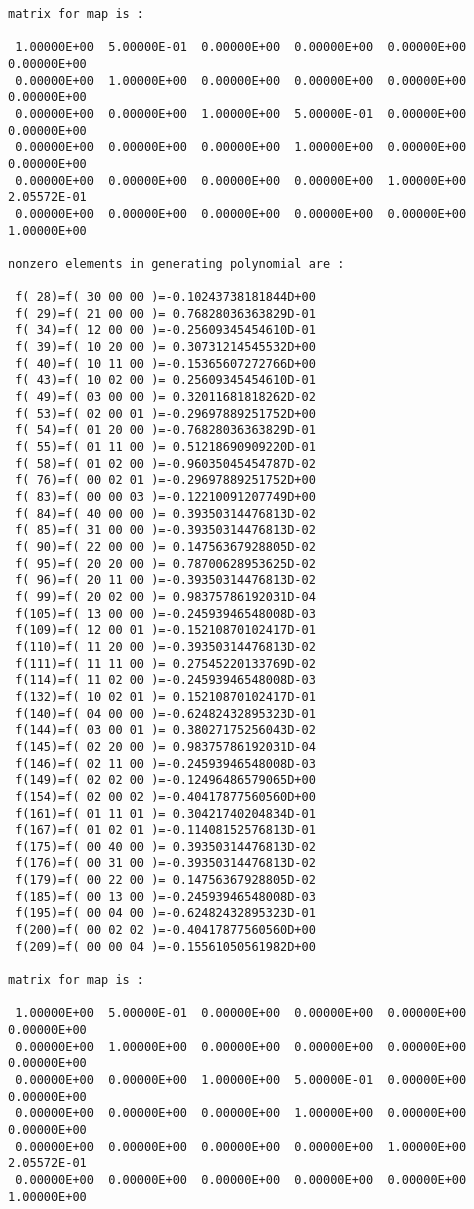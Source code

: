 \begin{footnotesize}
\begin{verbatim}
matrix for map is :

 1.00000E+00  5.00000E-01  0.00000E+00  0.00000E+00  0.00000E+00  0.00000E+00
 0.00000E+00  1.00000E+00  0.00000E+00  0.00000E+00  0.00000E+00  0.00000E+00
 0.00000E+00  0.00000E+00  1.00000E+00  5.00000E-01  0.00000E+00  0.00000E+00
 0.00000E+00  0.00000E+00  0.00000E+00  1.00000E+00  0.00000E+00  0.00000E+00
 0.00000E+00  0.00000E+00  0.00000E+00  0.00000E+00  1.00000E+00  2.05572E-01
 0.00000E+00  0.00000E+00  0.00000E+00  0.00000E+00  0.00000E+00  1.00000E+00

nonzero elements in generating polynomial are :

 f( 28)=f( 30 00 00 )=-0.10243738181844D+00
 f( 29)=f( 21 00 00 )= 0.76828036363829D-01
 f( 34)=f( 12 00 00 )=-0.25609345454610D-01
 f( 39)=f( 10 20 00 )= 0.30731214545532D+00
 f( 40)=f( 10 11 00 )=-0.15365607272766D+00
 f( 43)=f( 10 02 00 )= 0.25609345454610D-01
 f( 49)=f( 03 00 00 )= 0.32011681818262D-02
 f( 53)=f( 02 00 01 )=-0.29697889251752D+00
 f( 54)=f( 01 20 00 )=-0.76828036363829D-01
 f( 55)=f( 01 11 00 )= 0.51218690909220D-01
 f( 58)=f( 01 02 00 )=-0.96035045454787D-02
 f( 76)=f( 00 02 01 )=-0.29697889251752D+00
 f( 83)=f( 00 00 03 )=-0.12210091207749D+00
 f( 84)=f( 40 00 00 )= 0.39350314476813D-02
 f( 85)=f( 31 00 00 )=-0.39350314476813D-02
 f( 90)=f( 22 00 00 )= 0.14756367928805D-02
 f( 95)=f( 20 20 00 )= 0.78700628953625D-02
 f( 96)=f( 20 11 00 )=-0.39350314476813D-02
 f( 99)=f( 20 02 00 )= 0.98375786192031D-04
 f(105)=f( 13 00 00 )=-0.24593946548008D-03
 f(109)=f( 12 00 01 )=-0.15210870102417D-01
 f(110)=f( 11 20 00 )=-0.39350314476813D-02
 f(111)=f( 11 11 00 )= 0.27545220133769D-02
 f(114)=f( 11 02 00 )=-0.24593946548008D-03
 f(132)=f( 10 02 01 )= 0.15210870102417D-01
 f(140)=f( 04 00 00 )=-0.62482432895323D-01
 f(144)=f( 03 00 01 )= 0.38027175256043D-02
 f(145)=f( 02 20 00 )= 0.98375786192031D-04
 f(146)=f( 02 11 00 )=-0.24593946548008D-03
 f(149)=f( 02 02 00 )=-0.12496486579065D+00
 f(154)=f( 02 00 02 )=-0.40417877560560D+00
 f(161)=f( 01 11 01 )= 0.30421740204834D-01
 f(167)=f( 01 02 01 )=-0.11408152576813D-01
 f(175)=f( 00 40 00 )= 0.39350314476813D-02
 f(176)=f( 00 31 00 )=-0.39350314476813D-02
 f(179)=f( 00 22 00 )= 0.14756367928805D-02
 f(185)=f( 00 13 00 )=-0.24593946548008D-03
 f(195)=f( 00 04 00 )=-0.62482432895323D-01
 f(200)=f( 00 02 02 )=-0.40417877560560D+00
 f(209)=f( 00 00 04 )=-0.15561050561982D+00

matrix for map is :

 1.00000E+00  5.00000E-01  0.00000E+00  0.00000E+00  0.00000E+00  0.00000E+00
 0.00000E+00  1.00000E+00  0.00000E+00  0.00000E+00  0.00000E+00  0.00000E+00
 0.00000E+00  0.00000E+00  1.00000E+00  5.00000E-01  0.00000E+00  0.00000E+00
 0.00000E+00  0.00000E+00  0.00000E+00  1.00000E+00  0.00000E+00  0.00000E+00
 0.00000E+00  0.00000E+00  0.00000E+00  0.00000E+00  1.00000E+00  2.05572E-01
 0.00000E+00  0.00000E+00  0.00000E+00  0.00000E+00  0.00000E+00  1.00000E+00


\end{verbatim}
\end{footnotesize}
